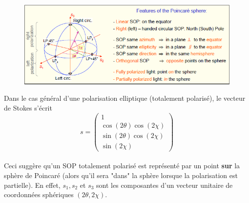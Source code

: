 	\begin{figure}
	\vspace{-5mm}
	\includegraphics[scale=0.6]{ch1/image43}
	\end{figure}
	Dans le cas général d'une polarisation elliptique (totalement polarisé), le vecteur de Stokes
	s'écrit
	\begin{equation}
	s = \left( {\begin{array}{*{20}{c}}
1\\
{\cos (2\theta )\cos (2\chi )}\\
{\sin (2\theta )\cos (2\chi )}\\
{\sin (2\chi )}
\end{array}} \right)
	\end{equation}\ \\
	
	Ceci suggère qu'un SOP totalement polarisé est représenté par un point \textbf{sur} la sphère
	de Poincaré (alors qu'il sera "dans" la sphère lorsque la polarisation est partielle). En effet,
	$s_1, s_2$ et $s_3$ sont les composantes d'un vecteur unitaire de coordonnées sphériques
	$(2\theta, 2\chi)$.\\
	
